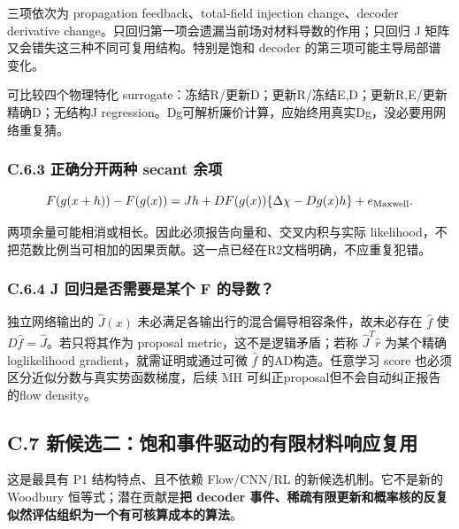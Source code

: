 \documentclass[
  11pt,
  a4paper,
]{article}
\begin{document}
三项依次为 propagation feedback、total-field injection change、decoder
derivative change。只回归第一项会遗漏当前场对材料导数的作用；只回归 J
矩阵又会错失这三种不同可复用结构。特别是饱和 decoder
的第三项可能主导局部谱变化。

可比较四个物理特化
surrogate：冻结R/更新D；更新R/冻结E,D；更新R,E/更新精确D；无结构J
regression。Dg可解析廉价计算，应始终用真实Dg，没必要用网络重复猜。

\hypertarget{c.6.3-ux6b63ux786eux5206ux5f00ux4e24ux79cd-secant-ux4f59ux9879}{%
\subsubsection{C.6.3 正确分开两种 secant
余项}\label{c.6.3-ux6b63ux786eux5206ux5f00ux4e24ux79cd-secant-ux4f59ux9879}}

\[
F(g(x+h))-F(g(x))
=Jh+DF(g(x))\{\Delta\chi-Dg(x)h\}+e_{\rm Maxwell}.
\]

两项余量可能相消或相长。因此必须报告向量和、交叉内积与实际
likelihood，不把范数比例当可相加的因果贡献。这一点已经在R2文档明确，不应重复犯错。

\hypertarget{c.6.4-j-ux56deux5f52ux662fux5426ux9700ux8981ux662fux67d0ux4e2a-f-ux7684ux5bfcux6570}{%
\subsubsection{C.6.4 J 回归是否需要是某个 F
的导数？}\label{c.6.4-j-ux56deux5f52ux662fux5426ux9700ux8981ux662fux67d0ux4e2a-f-ux7684ux5bfcux6570}}

独立网络输出的 \(\widehat J(x)\)
未必满足各输出行的混合偏导相容条件，故未必存在 \(\widehat f\) 使
\(D\widehat f=\widehat J\)。若只将其作为 proposal
metric，这不是逻辑矛盾；若称 \(\widehat J^T\widehat r\) 为某个精确
loglikelihood gradient，就需证明或通过可微 \(\widehat f\)
的AD构造。任意学习 score 也必须区分近似分数与真实势函数梯度，后续 MH
可纠正proposal但不会自动纠正报告的flow density。

\hypertarget{c.7-ux65b0ux5019ux9009ux4e8cux9971ux548cux4e8bux4ef6ux9a71ux52a8ux7684ux6709ux9650ux6750ux6599ux54cdux5e94ux590dux7528}{%
\subsection{C.7
新候选二：饱和事件驱动的有限材料响应复用}\label{c.7-ux65b0ux5019ux9009ux4e8cux9971ux548cux4e8bux4ef6ux9a71ux52a8ux7684ux6709ux9650ux6750ux6599ux54cdux5e94ux590dux7528}}

这是最具有 P1 结构特点、且不依赖 Flow/CNN/RL 的新候选机制。它不是新的
Woodbury 恒等式；潜在贡献是\textbf{把 decoder
事件、稀疏有限更新和概率核的反复似然评估组织为一个有可核算成本的算法}。
\end{document}
